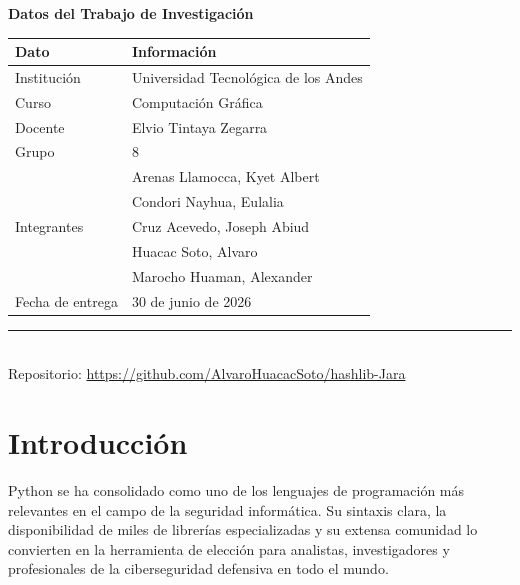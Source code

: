 \documentclass[12pt,a4paper]{article}
\begin{document}
\thispagestyle{empty}
\begin{center}
\vspace*{2cm}

{\Large \textbf{Datos del Trabajo de Investigación}}\\[24pt]

\begin{table}[H]
\centering
\begin{tabular}{p{4cm}p{9cm}}
\toprule
\textbf{Dato} & \textbf{Información} \\
\midrule
Institución & Universidad Tecnológica de los Andes \\
Curso & Computación Gráfica \\
Docente & Elvio Tintaya Zegarra \\
Grupo & 8 \\
\multirow{5}{4cm}{Integrantes} & Arenas Llamocca, Kyet Albert \\
 & Condori Nayhua, Eulalia \\
 & Cruz Acevedo, Joseph Abiud \\
 & Huacac Soto, Alvaro \\
 & Marocho Huaman, Alexander \\
Fecha de entrega & 30 de junio de 2026 \\
\bottomrule
\end{tabular}
\end{table}

\vspace{12pt}
\rule{10cm}{0.5pt}\\[12pt]
{\footnotesize Repositorio: \url{https://github.com/AlvaroHuacacSoto/hashlib-Jara}}
\end{center}
\newpage

\tableofcontents
\newpage

\section{Introducción}

Python se ha consolidado como uno de los lenguajes de programación más
relevantes en el campo de la seguridad informática. Su sintaxis clara,
la disponibilidad de miles de librerías especializadas y su extensa
comunidad lo convierten en la herramienta de elección para analistas,
investigadores y profesionales de la ciberseguridad defensiva en todo el
mundo.
\end{document}
